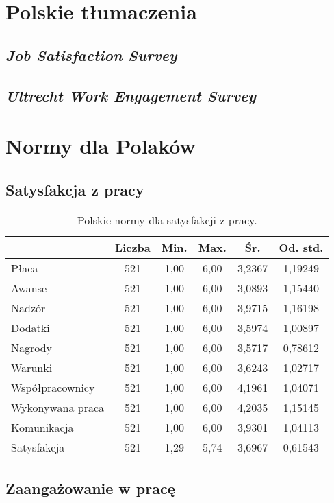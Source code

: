 \appendix
\section{Polskie tłumaczenia}
\subsection{\emph{Job Satisfaction Survey}}
\subsection{\emph{Ultrecht Work Engagement Survey}}

\section{Normy dla Polaków}
\subsection{Satysfakcja z pracy}
\label{sec:app-jss-norms}

\begin{table}[h!]
\begin{center}
\begin{tabular}{l | c c c c c}
  & Liczba & Min. & Max. & Śr. & Od. std. \\ \hline
Płaca & 521 & 1,00 & 6,00 & 3,2367 & 1,19249 \\
Awanse & 521 & 1,00 & 6,00 & 3,0893 & 1,15440 \\ 
Nadzór &  521 & 1,00 & 6,00 & 3,9715 & 1,16198 \\
Dodatki &  521 & 1,00 & 6,00 & 3,5974 & 1,00897 \\
Nagrody &  521 & 1,00 & 6,00 & 3,5717 & 0,78612 \\
Warunki &  521 & 1,00 & 6,00 & 3,6243 & 1,02717 \\
Współpracownicy &  521 & 1,00 & 6,00 & 4,1961 & 1,04071 \\
Wykonywana praca &  521 & 1,00 & 6,00 & 4,2035 & 1,15145 \\
Komunikacja & 521 & 1,00 & 6,00 & 3,9301 & 1,04113 \\ \hline
Satysfakcja & 521 & 1,29 & 5,74 & 3,6967 & 0,61543 \\
\end{tabular}
\end{center}
\caption{Polskie normy dla satysfakcji z pracy.}
\label{tab:jss-pl-norms}
\end{table}

\subsection{Zaangażowanie w pracę}
\label{sec:app-uwes-norms}

